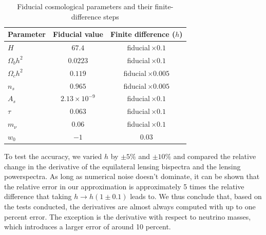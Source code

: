 \documentclass[11pt]{article} %
\begin{document}
\begin{table}[h!]
    \centering
    \begin{tabular}{|l|c|c|}
    \hline
    Parameter & Fiducial value & Finite difference ($h$) \\
    \hline
    $H$            & $67.4$               & fiducial\,$\times0.1$   \\
    $\Omega_b h^2$ & $0.0223$             & fiducial\,$\times0.1$   \\
    $\Omega_c h^2$ & $0.119$              & fiducial\,$\times0.005$ \\
    $n_s$          & $0.965$              & fiducial\,$\times0.005$ \\
    $A_s$          & $2.13\times10^{-9}$  & fiducial\,$\times0.1$   \\
    $\tau$         & $0.063$              & fiducial\,$\times 0.1$   \\
    $m_\nu$        & $0.06$               & fiducial\,$\times0.1$   \\
    $w_0$          & $-1$                 & $0.03$                  \\
    \hline
    \end{tabular}
    \caption{Fiducial cosmological parameters and their finite-difference steps}
    \label{tab:cosmo-params-diff}
\end{table}
    
    

To test the accuracy, we varied $h$ by $\pm 5\%$ and $\pm 10\%$ and compared the relative change in the derivative of the equilateral lensing bispectra and the lensing powerspectra. As long as numerical noise doesn't dominate, it can be shown that the relative error in our approximation is approximately 5 times the relative difference that taking $h \rightarrow h(1 \pm 0.1)$ leads to. We thus conclude that, based on the tests conducted, the derivatives are almost always computed with up to one percent error. The exception is the derivative with respect to neutrino masses, which introduces a larger error of around 10 percent.

\end{document}
